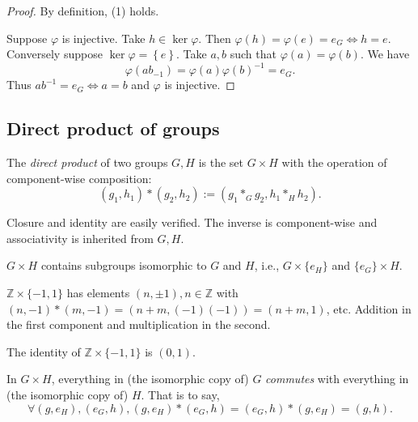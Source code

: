 \documentclass[a4paper]{article}
\begin{document}
    \begin{proof}
        By definition, (1) holds.

        Suppose $ \varphi $ is injective. Take $ h\in \ker \varphi $. Then $ \varphi(h)=\varphi(e)=e_G \Leftrightarrow h=e $. Conversely suppose $ \ker \varphi=\left\{ e\right\} $. Take $ a,b $ such that $ \varphi(a)=\varphi(b) $. We have
        \[
            \varphi(ab_{-1})=\varphi(a)\varphi(b)^{-1}=e_G
        .\]
        Thus $ ab^{-1}=e_G \Leftrightarrow a=b $ and $ \varphi $ is injective.
    \end{proof}
    \subsection{Direct product of groups}
    \begin{definition}
        The \textit{direct product} of two groups $ G,H $ is the set $ G\times H $ with the operation of component-wise composition:
        \[
            (g_1,h_1) * (g_2,h_2):=(g_1*_G g_2, h_1 *_H h_2)
        .\]
    \end{definition}
    Closure and identity are easily verified. The inverse is component-wise and associativity is inherited from $G,H$.
    \begin{remark}
        $ G\times H $ contains subgroups isomorphic to $G$ and $H$, i.e., $ G \times \{e_H\} $ and $ \{e_G\} \times H $.
    \end{remark}
    \begin{example}
        $ \mathbb{Z} \times \{-1,1\} $ has elements $ (n,\pm 1), n\in \mathbb{Z} $ with $ (n,-1)*(m,-1)=(n+m,(-1)(-1))=(n+m,1) $, etc. Addition in the first component and multiplication in the second.

        The identity of $\mathbb{Z} \times \{-1,1\}$ is $(0,1)$.
    \end{example}
    \begin{remark}
        In $ G \times H $, everything in (the isomorphic copy of) $G$ \textit{commutes} with everything in (the isomorphic copy of) $H$. That is to say,
        \[
            \forall (g,e_H), (e_G,h), (g,e_H)*(e_G,h) = (e_G, h)*(g,e_H)=(g,h)
        .\]
    \end{remark}
\end{document}
